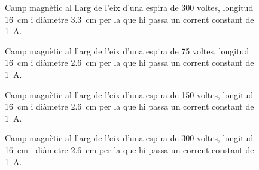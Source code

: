 \begin{figure}
	\sffamily \small
	\centering
	
	\caption{Camp magnètic al llarg de l'eix d'una espira de 300 voltes, longitud \SI{16}{cm} i diàmetre \SI{3.3}{cm} per la que hi passa un corrent constant de \SI{1}{A}.}
	\label{fig:camp 300/33}
\end{figure}

\begin{figure}
	\sffamily \small
	\centering
	
	\caption{Camp magnètic al llarg de l'eix d'una espira de 75 voltes, longitud \SI{16}{cm} i diàmetre \SI{2.6}{cm} per la que hi passa un corrent constant de \SI{1}{A}.}
	\label{fig:camp 75/26}
\end{figure}

\begin{figure}
	\sffamily \small
	\centering
	
	\caption{Camp magnètic al llarg de l'eix d'una espira de 150 voltes, longitud \SI{16}{cm} i diàmetre \SI{2.6}{cm} per la que hi passa un corrent constant de \SI{1}{A}.}
	\label{fig:camp 150/26}
\end{figure}

\begin{figure}
	\sffamily \small
	\centering
	
	\caption{Camp magnètic al llarg de l'eix d'una espira de 300 voltes, longitud \SI{16}{cm} i diàmetre \SI{2.6}{cm} per la que hi passa un corrent constant de \SI{1}{A}.}
	\label{fig:camp 300/26}
\end{figure}
